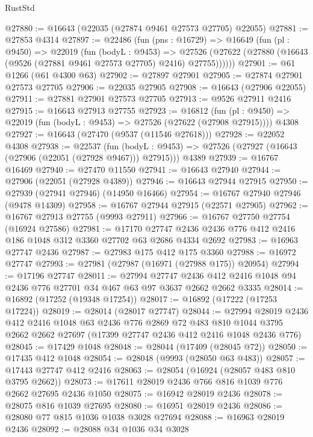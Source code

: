 \begin{lexlean}{RustStd}
\begin{coremodule}
@27880 := @16643 (@22035 (@27874 @9461 @27573 @27705) @22055)
@27881 := @27853 @4314
@27897 := @22486
    (fun (pns : @16729) =>
    @16649
      (fun (pl : @9450) =>
      @22019
        (fun (bodyL : @9453) =>
        @27526 (@27622 (@27880 (@16643 (@9526 (@27881 @9461 @27573 @27705) @2416) @27755))))))
@27901 := @61 @1266 (@61 @4300 @63)
@27902 := @27897 @27901
@27905 := @27874 @27901 @27573 @27705
@27906 := @22035 @27905
@27908 := @16643 (@27906 @22055)
@27911 := @27881 @27901 @27573 @27705
@27913 := @9526 @27911 @2416
@27915 := @16643 @27913 @27755
@27923 := @16812
    (fun (pl : @9450) => @22019 (fun (bodyL : @9453) => @27526 (@27622 (@27908 @27915))))
    @4308
@27927 := @16643 (@27470 (@9537 (@11546 @27618)))
@27928 := @22052 @4308
@27938 := @22537
    (fun (bodyL : @9453) => @27526 (@27927 (@16643 (@27906 (@22051 (@27928 @9467))) @27915)))
    @4389
@27939 := @16767 @16469
@27940 := @27470 @11550
@27941 := @16643 @27940
@27944 := @27906 (@22051 (@27928 @4389))
@27946 := @16643 @27944 @27915
@27950 := @27939 (@27941 @27946) (@14950 @16466)
@27954 := @16767 @27940 @27946 (@9478 @14309)
@27958 := @16767 @27944 @27915 (@22571 @27905)
@27962 := @16767 @27913 @27755 (@9993 @27911)
@27966 := @16767 @27750 @27754 (@16924 @27586)
@27981 := @17170
    @27747
    @2436
    @2436
    @776
    @412
    @2416
    @186
    @1048
    @312
    @3360
    @27702
    @63
    @2686
    @4334
    @2692
@27983 := @16963 @27747 @2436
@27987 := @27983 @175 @412 @175 @3360
@27988 := @16972 @27747
@27993 := @27981 (@27987 (@16971 (@27988 @175)) @20954)
@27994 := @17196 @27747
@28011 := @27994
    @27747
    @2436
    @412
    @2416
    @1048
    @94
    @2436
    @776
    @27701
    @34
    @467
    @63
    @97
    @3637
    @2662
    @2662
    @3335
@28014 := @16892 (@17252 (@19348 @17254))
@28017 := @16892 (@17222 (@17253 @17224))
@28019 := @28014 (@28017 @27747)
@28044 := @27994
    @28019
    @2436
    @412
    @2416
    @1048
    @63
    @2436
    @776
    @2869
    @72
    @483
    @810
    @1044
    @3795
    @2662
    @2662
    @27697
    (@17399 @27747 @2436 @412 @2416 @1048 @2436 @776)
@28045 := @17429 @1048
@28048 := @28044 (@17409 (@28045 @72))
@28050 := @17435 @412 @1048
@28054 := @28048 (@9993 (@28050 @63 @483))
@28057 := @17443 @27747 @412 @2416
@28063 := @28054 (@16924 (@28057 @483 @810 @3795 @2662))
@28073 := @17611 @28019 @2436 @766 @816 @1039 @776 @2662 @27695 @2436 @1050
@28075 := @16942 @28019 @2436
@28078 := @28075 @816 @1039 @27695
@28080 := @16951 @28019 @2436
@28086 := @28080 @77 @815 @1036 @1038 @3028 @27694
@28088 := @16963 @28019 @2436
@28092 := @28088 @34 @1036 @34 @3028

\end{coremodule}
\end{lexlean}
